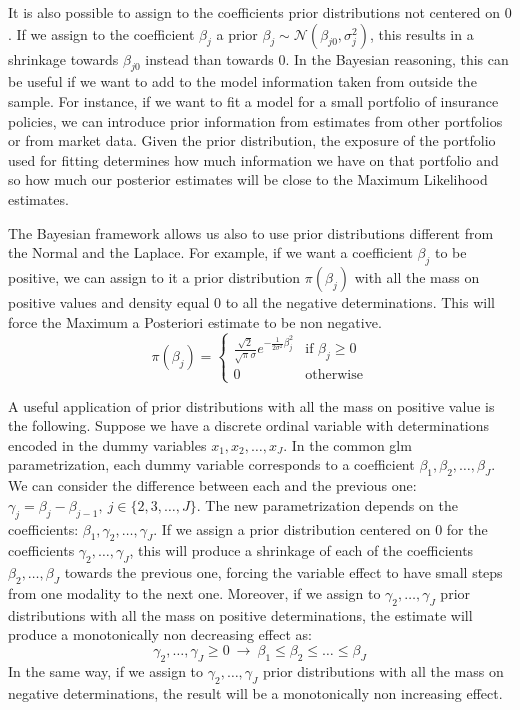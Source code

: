 \documentclass[a4paper, twoside, openright, 12pt]{report}
\theoremstyle{definition}
\theoremstyle{definition}
\theoremstyle{definition}
\theoremstyle{remark}
\begin{document}
It is also possible to assign to the coefficients prior distributions not centered on \(0\). If we assign to the coefficient \(\beta_j\) a prior \(\beta_j\sim\mathcal{N}(\beta_{j0}, \sigma_j^2)\), this results in a shrinkage towards \(\beta_{j0}\) instead than towards \(0\). In the Bayesian reasoning, this can be useful if we want to add to the model information taken from outside the sample. For instance, if we want to fit a model for a small portfolio of insurance policies, we can introduce prior information from estimates from other portfolios or from market data. Given the prior distribution, the exposure of the portfolio used for fitting determines how much information we have on that portfolio and so how much our posterior estimates will be close to the Maximum Likelihood estimates.

The Bayesian framework allows us also to use prior distributions different from the Normal and the Laplace. For example, if we want a coefficient \(\beta_j\) to be positive, we can assign to it a prior distribution \(\pi(\beta_j)\) with all the mass on positive values and density equal \(0\) to all the negative determinations. This will force the Maximum a Posteriori estimate to be non negative.
\[
\pi(\beta_j) =
\begin{cases}
\frac{\sqrt{2}}{\sqrt{\pi}\sigma}e^{-\frac{1}{2\sigma^2}\beta_j^2} & \text{if } \beta_j \ge 0 \\
0 & \text{otherwise}
\end{cases}
\]

A useful application of prior distributions with all the mass on positive value is the following. Suppose we have a discrete ordinal variable with determinations encoded in the dummy variables \(x_1, x_2, \dots, x_J\). In the common \ac{glm} parametrization, each dummy variable corresponds to a coefficient \(\beta_1, \beta_2, \dots, \beta_J\). We can consider the difference between each and the previous one: \(\gamma_j = \beta_j - \beta_{j-1}, \ j\in\{2, 3, \dots, J\}\). The new parametrization depends on the coefficients: \(\beta_1, \gamma_2, \dots, \gamma_J\). If we assign a prior distribution centered on \(0\) for the coefficients \(\gamma_2, \dots, \gamma_J\), this will produce a shrinkage of each of the coefficients \(\beta_2, \dots, \beta_J\) towards the previous one, forcing the variable effect to have small steps from one modality to the next one. Moreover, if we assign to \(\gamma_2, \dots, \gamma_J\) prior distributions with all the mass on positive determinations, the estimate will produce a monotonically non decreasing effect as:
\[
\gamma_2, \dots, \gamma_J \ge 0 \ \longrightarrow \ \beta_1\le\beta_2\le\dots\le\beta_J
\]
In the same way, if we assign to \(\gamma_2, \dots, \gamma_J\) prior distributions with all the mass on negative determinations, the result will be a monotonically non increasing effect.
\end{document}
